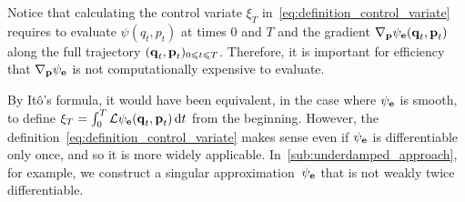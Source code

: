 \documentclass[11pt,a4paper]{article}
\begin{document}
\begin{remark}
    \label{remark:cost_control_variate}
    Notice that calculating the control variate $\xi_T$ in~\eqref{eq:definition_control_variate} requires
    to evaluate $\psi(q_t, p_t)$ at times 0 and $T$ and the gradient $\nabla_{\boldsymbol{\mathbf p}} \psi_{\boldsymbol{\mathbf e}}(\boldsymbol{\mathbf q}_t, \boldsymbol{\mathbf p}_t)$ along the full trajectory $(\boldsymbol{\mathbf q}_t, \boldsymbol{\mathbf p}_t)_{0\leqslant t\leqslant T}$.
    Therefore, it is important for efficiency that $\nabla_{\boldsymbol{\mathbf p}} \psi_{\boldsymbol{\mathbf e}}$ is not computationally expensive to evaluate.
\end{remark}

\begin{remark}
    By It\^o's formula,
    it would have been equivalent, in the case where $\psi_{\boldsymbol{\mathbf e}}$ is smooth,
    to define
    \(
        \xi_T = \int_{0}^{T} \mathcal L \psi_{\boldsymbol{\mathbf e}}(\boldsymbol{\mathbf q}_t, \boldsymbol{\mathbf p}_t) \, \mathrm d t
    \)
    from the beginning.
    However, the definition~\eqref{eq:definition_control_variate} makes sense even if $\psi_{\boldsymbol{\mathbf e}}$ is differentiable only once,
    and so it is more widely applicable.
    In~\cref{sub:underdamped_approach}, for example, we construct a singular approximation~$\psi_{\boldsymbol{\mathbf e}}$ that is not weakly twice differentiable.
\end{remark}
\end{document}
